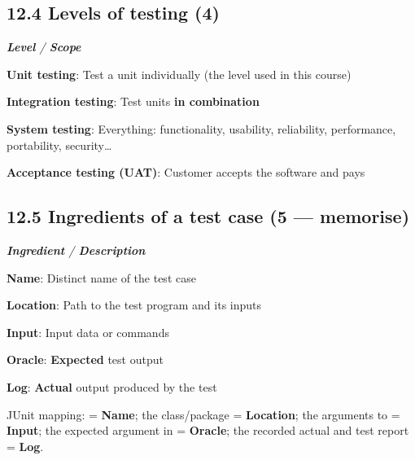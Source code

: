 \begin{studycolumns}
\vspace{0pt}

\subsection*{12.4 Levels of testing (4)}

\begin{referenceentries}
\textit{\textbf{Level} / \textbf{Scope}}\par\smallskip
\noindent \textbf{\textbf{Unit testing}}: Test a unit individually (the level used in this course)\par
\noindent \textbf{\textbf{Integration testing}}: Test units \textbf{in combination}\par
\noindent \textbf{\textbf{System testing}}: Everything: functionality, usability, reliability, performance, portability, security\ldots{}\par
\noindent \textbf{\textbf{Acceptance testing (UAT)}}: Customer accepts the software and pays\par
\end{referenceentries}
\subsection*{12.5 Ingredients of a test case (5 --- memorise)}

\begin{referenceentries}
\textit{\textbf{Ingredient} / \textbf{Description}}\par\smallskip
\noindent \textbf{\textbf{Name}}: Distinct name of the test case\par
\noindent \textbf{\textbf{Location}}: Path to the test program and its inputs\par
\noindent \textbf{\textbf{Input}}: Input data or commands\par
\noindent \textbf{\textbf{Oracle}}: \textbf{Expected} test output\par
\noindent \textbf{\textbf{Log}}: \textbf{Actual} output produced by the test\par
\end{referenceentries}
JUnit mapping:  = \textbf{Name}; the class/\allowbreak{}package = \textbf{Location}; the arguments to  = \textbf{Input}; the expected argument in  = \textbf{Oracle}; the recorded actual  and test report = \textbf{Log}.



\end{studycolumns}
